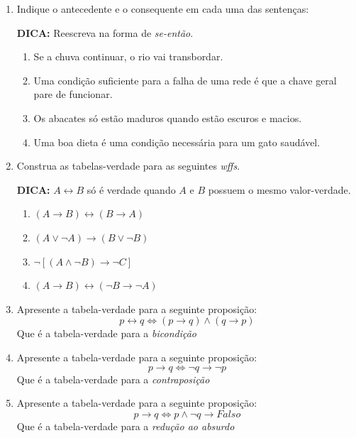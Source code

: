 \documentclass[oneside,a4paper,12pt]{article}
\begin{document}
\begin{enumerate}



	\item Indique o antecedente e o consequente em cada uma das sentenças:
	
	\textbf{DICA: }Reescreva na forma de {\it se-então}.
	
	\begin{enumerate}
		\item Se a chuva continuar, o rio vai transbordar.
		\item Uma condição suficiente para a falha de uma rede é que a chave geral pare de funcionar.
		\item Os abacates só estão maduros quando estão escuros e macios.
		\item Uma boa dieta é uma condição necessária para um gato saudável.
	\end{enumerate}


	\item Construa as tabelas-verdade para as seguintes {\it wffs}.
	
	\textbf{DICA: } $A \leftrightarrow B$ só é verdade quando $A$ e $B$ possuem o mesmo valor-verdade.
	
	\begin{enumerate}
		\item $(A \rightarrow B) \leftrightarrow (B \rightarrow A)$
		\item $(A \lor \neg A) \rightarrow (B \lor \neg B)$
		\item $\neg [(A \land \neg B) \rightarrow \neg C]$
		\item $(A \rightarrow B) \leftrightarrow (\neg B \rightarrow \neg A)$
	\end{enumerate}

	\item Apresente a tabela-verdade para a seguinte proposição:
	$$p \leftrightarrow q \Leftrightarrow (p \rightarrow q) \land (q \rightarrow p)$$
	Que é a tabela-verdade para a {\it bicondição}

	\item Apresente a tabela-verdade para a seguinte proposição:
	$$p \rightarrow q \Leftrightarrow \neg q \rightarrow \neg p$$
	Que é a tabela-verdade para a {\it contraposição}

	\item Apresente a tabela-verdade para a seguinte proposição:
	$$p \rightarrow q \Leftrightarrow p \land \neg q \rightarrow Falso$$
	Que é a tabela-verdade para a {\it redução ao absurdo}


\end{enumerate}
\end{document}
